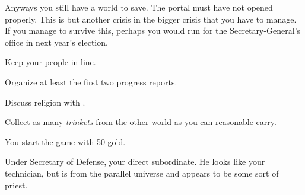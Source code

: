 \documentclass[char]{guildcamp3}
\begin{document}
Anyways you still have a world to save. The portal must have not opened properly. This is but another crisis in the bigger crisis that you have to manage. If you manage to survive this, perhaps you would run for the Secretary-General's office in next year's election.

\begin{itemz}[Goals]
  \item Keep your people in line.
  \item Organize at least the first two progress reports.
  \item Discuss religion with \cPaladin{}.
  \item Collect as many \emph{trinkets} from the other world as you can reasonable carry.
\end{itemz}

\begin{itemz}[Notes]
	\item You start the game with 50 gold. 
	\end{itemz}
\begin{contacts}
  \contact{\cPoliOne{}} Under Secretary of Defense, your direct subordinate.
  \contact{\cPaladin{}} He looks like your technician, but is from the parallel universe and appears to be some sort of priest.
\end{contacts}
\end{document}
